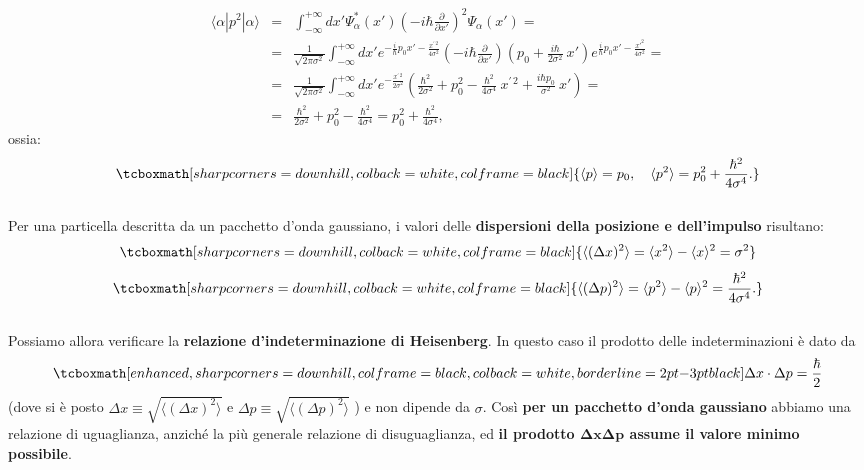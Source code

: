 \documentclass[a4paper,12pt,oneside]{book}
\begin{document}
	\begin{eqnarray}
		\langle \alpha | p^2 | \alpha \rangle  &=& \int_{-\infty}^{+\infty} dx' \Psi ^* _\alpha(x') \left(-i \hbar \frac{\partial}{\partial x'} \right)^2 \Psi_\alpha(x') = \nonumber \\
		&=& \frac{1}{\sqrt{2 \pi \sigma^2}} \int_{-\infty}^{+\infty} dx' e^{-\frac{i}{\hbar}p_0 x' - \frac{x^{\prime \,2}}{4 \sigma^2}} \left(-i \hbar \frac{\partial}{\partial x'} \right)\left(p_0 + \frac{i \hbar}{2 \sigma^2} ~x' \right) e^{\frac{i}{\hbar}p_0 x' - \frac{x'^2}{4 \sigma^2}} = \nonumber \\
		&=& \frac{1}{\sqrt{2 \pi \sigma^2}} \int_{-\infty}^{+\infty} dx'  e^{- \frac{x^{\prime \,2}}{2 \sigma^2}} \left(\frac{\hbar^2}{2 \sigma^2} + p_0^2 - \frac{\hbar^2}{4 \sigma^4}~x^{\prime \,2} + \frac{i \hbar p_0}{\sigma^2}~x' \right) = \nonumber \\
		&=& \frac{\hbar^2}{2 \sigma^2} + p_0^2 - \frac{\hbar^2}{4 \sigma^4} = p_0^2 + \frac{\hbar^2}{4 \sigma^4},
\end{eqnarray}
ossia:
	\begin{equation}
		\tcboxmath[sharp corners=downhill, colback=white, colframe=black]{
			\langle p \rangle = p_0, \quad \langle p^2 \rangle = p_0^2 + \frac{\hbar^2}{4 \sigma^4}.
			}
	\end{equation}\\
	
Per una particella descritta da un pacchetto d'onda gaussiano, i valori delle \textbf{dispersioni della posizione e dell'impulso} risultano:
	\begin{equation}
		\tcboxmath[sharp corners=downhill, colback=white, colframe=black]{
		\langle (\Delta x)^2 \rangle = \langle x^2 \rangle - \langle x \rangle^2 = \sigma^2
		}
	\end{equation}
	\begin{equation}
		\tcboxmath[sharp corners=downhill, colback=white, colframe=black]{
			\langle (\Delta p)^2 \rangle = \langle p^2 \rangle - \langle p \rangle^2 =  \frac{\hbar^2}{4 \sigma^4}.
			}
	\end{equation}\\
	
Possiamo allora verificare la \textbf{relazione d'indeterminazione di Heisenberg}. In questo caso il prodotto delle indeterminazioni è dato da
	\begin{equation}
		\tcboxmath[enhanced, sharp corners=downhill, colframe=black, colback=white, borderline={2pt}{-3pt}{black}]{
		\Delta x \cdot \Delta p = \frac{\hbar}{2}
		}
	\end{equation}
(dove si è posto $\Delta x \equiv \sqrt{\langle (\Delta x)^2 \rangle}$ e $\Delta p \equiv \sqrt{\langle (\Delta p)^2 \rangle}$ ) e non dipende da $\sigma$. Così \textbf{per un pacchetto d'onda gaussiano} abbiamo una relazione di uguaglianza, anziché la più generale relazione di disuguaglianza, ed \textbf{il prodotto $\mathbf{\Delta x \Delta p}$ assume il valore minimo possibile}.\\
\end{document}
